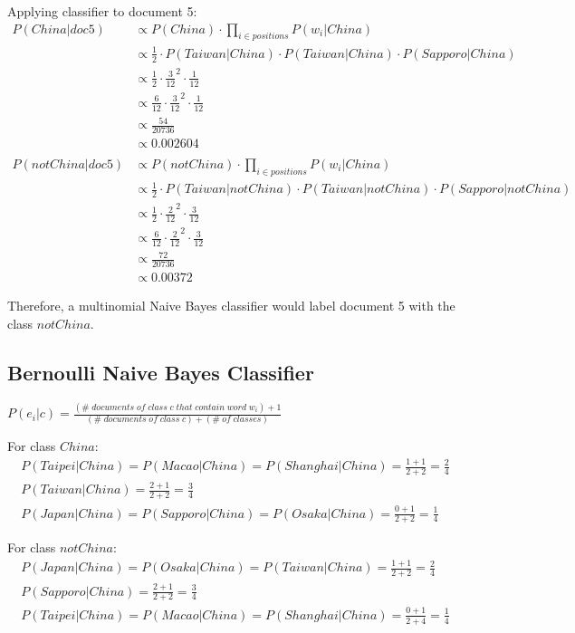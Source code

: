 \documentclass{article}
\begin{document}
Applying classifier to document 5:
\begin{align}
	P(China|doc5) & \propto P(China) \cdot \prod_{i \in positions} {P(w_i|China)} \\
	& \propto \frac{1}{2} \cdot P(Taiwan|China) \cdot P(Taiwan|China) \cdot P(Sapporo|China) \\
	& \propto \frac{1}{2} \cdot \frac{3}{12}^2 \cdot \frac{1}{12} \\
	& \propto \frac{6}{12} \cdot \frac{3}{12}^2 \cdot \frac{1}{12} \\
	& \propto \frac{54}{20736} \\
	& \propto 0.002604 \\
	& \nonumber \\ 
	P(notChina|doc5) & \propto P(notChina) \cdot \prod_{i \in positions} {P(w_i|China)} \\
	& \propto \frac{1}{2} \cdot P(Taiwan|notChina) \cdot P(Taiwan|notChina) \cdot P(Sapporo|notChina) \\
	& \propto \frac{1}{2} \cdot \frac{2}{12}^2 \cdot \frac{3}{12} \\
	& \propto \frac{6}{12} \cdot \frac{2}{12}^2 \cdot \frac{3}{12} \\	
	& \propto \frac{72}{20736} \\
	& \propto 0.00372
\end{align}

Therefore, a multinomial Naive Bayes classifier would label document 5 with the class $notChina$.

\subsection{Bernoulli Naive Bayes Classifier}

$P(e_i|c) = \frac{(\#\;documents\;of\;class\;c\;that\;contain\;word\;w_i) + 1}{(\#\;documents\;of\;class\;c) + (\#\;of\;classes)}$

For class $China$:
\begin{align}
P(Taipei|China) = P(Macao|China) = P(Shanghai|China) = \frac{1 + 1}{2 + 2} = \frac{2}{4} \\
P(Taiwan|China) = \frac{2 + 1}{2 + 2} = \frac{3}{4} \\
P(Japan|China) = P(Sapporo|China) = P(Osaka|China) = \frac{0 + 1}{2 + 2} = \frac{1}{4}
\end{align}

For class $notChina$:
\begin{align}
P(Japan|China) = P(Osaka|China) = P(Taiwan|China) = \frac{1 + 1}{2 + 2} = \frac{2}{4} \\
P(Sapporo|China) = \frac{2 + 1}{2 + 2} = \frac{3}{4} \\
P(Taipei|China) = P(Macao|China) = P(Shanghai|China) = \frac{0 + 1}{2 + 4} = \frac{1}{4}
\end{align}
\end{document}
